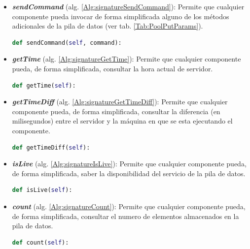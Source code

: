             \begin{itemize}
                \item \textbf{\textit{sendCommand}} (alg. \ref{Alg:signatureSendCommand}): Permite que cualquier componente pueda invocar de forma simplificada alguno de los métodos adicionales de la pila de datos (ver tab. \ref{Tab:PoolPutParams}).
                \begin{lstlisting}[language=Python, caption={Firma del método "\textit{sendCommand}".}, label=Alg:signatureSendCommand, numbers=none]
def sendCommand(self, command):
                \end{lstlisting}

                \item \textbf{\textit{getTime}} (alg. \ref{Alg:signatureGetTime}): Permite que cualquier componente pueda, de forma simplificada, consultar la hora actual de servidor.
                \begin{lstlisting}[language=Python, caption={Firma del método "\textit{getTime}".}, label=Alg:signatureGetTime, numbers=none]
def getTime(self):
                \end{lstlisting}

                \item \textbf{\textit{getTimeDiff}} (alg. \ref{Alg:signatureGetTimeDiff}): Permite que cualquier componente pueda, de forma simplificada, consultar la diferencia (en milisegundos) entre el servidor y la máquina en que se esta ejecutando el componente.
                \begin{lstlisting}[language=Python, caption={Firma del método "\textit{getTimeDiff}".}, label=Alg:signatureGetTimeDiff, numbers=none]
def getTimeDiff(self):
                \end{lstlisting}

                \item \textbf{\textit{isLive}} (alg. \ref{Alg:signatureIsLive}): Permite que cualquier componente pueda, de forma simplificada, saber la disponibilidad del servicio de la pila de datos.
                \begin{lstlisting}[language=Python, caption={Firma del método "\textit{isLive}".}, label=Alg:signatureIsLive, numbers=none]
def isLive(self):
                \end{lstlisting}

                \item \textbf{\textit{count}} (alg. \ref{Alg:signatureCount}): Permite que cualquier componente pueda, de forma simplificada, consultar el numero de elementos almacenados en la pila de datos.
                \begin{lstlisting}[language=Python, caption={Firma del método "\textit{count}".}, label=Alg:signatureCount, numbers=none]
def count(self):
                \end{lstlisting}
            
            \end{itemize}
    
